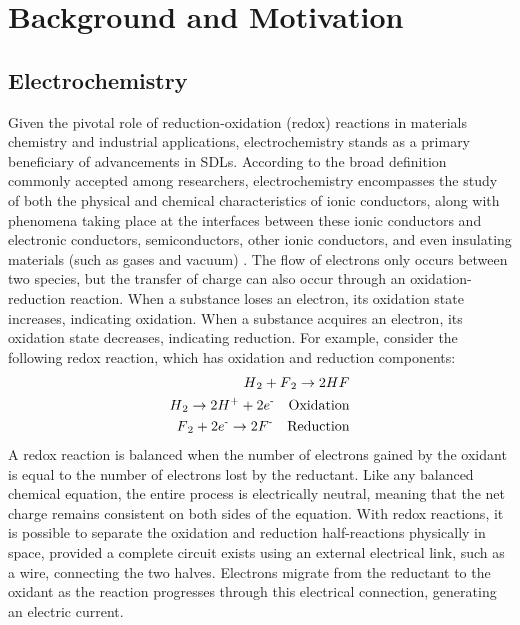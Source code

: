 \chapter{Background and Motivation} \label{chap:chap-1}



\section{Electrochemistry}
Given the pivotal role of reduction-oxidation (redox) reactions in materials chemistry and industrial applications, electrochemistry stands as a primary beneficiary of advancements in SDLs. According to the broad definition commonly accepted among researchers, electrochemistry encompasses the study of both the physical and chemical characteristics of ionic conductors, along with phenomena taking place at the interfaces between these ionic conductors and electronic conductors, semiconductors, other ionic conductors, and even insulating materials (such as gases and vacuum) \cite{Bagotsky2005}. The flow of electrons only occurs between two species, but the transfer of charge can also occur through an oxidation-reduction reaction. When a substance loses an electron, its oxidation state increases, indicating oxidation. When a substance acquires an electron, its oxidation state decreases, indicating reduction. For example, consider the following redox reaction, which has oxidation and reduction components:
\begin{align}
H\textsubscript{2} + F\textsubscript{2} \to 2HF \label{eq:reaction} \\
H\textsubscript{2} \to 2H\textsuperscript{+} + 2e\textsuperscript{-} \quad \text{Oxidation} \label{eq:oxidation}\\
F\textsubscript{2} + 2e\textsuperscript{-} \to 2F\textsuperscript{-} \quad 
\text{Reduction} \label{eq:reduction}
\end{align}
A redox reaction is balanced when the number of electrons gained by the oxidant is equal to the number of electrons lost by the reductant. Like any balanced chemical equation, the entire process is electrically neutral, meaning that the net charge remains consistent on both sides of the equation.
With redox reactions, it is possible to separate the oxidation and reduction half-reactions physically in space, provided a complete circuit exists using an external electrical link, such as a wire, connecting the two halves. Electrons migrate from the reductant to the oxidant as the reaction progresses through this electrical connection, generating an electric current. 

